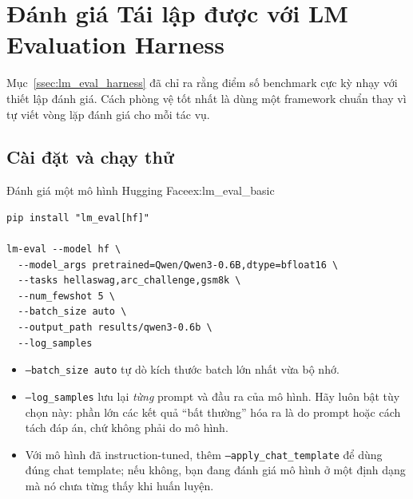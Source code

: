 
\section{Đánh giá Tái lập được với LM Evaluation Harness \newtag}
\label{sec:lm_eval_practice}

Mục~\ref{ssec:lm_eval_harness} đã chỉ ra rằng điểm số benchmark cực kỳ nhạy với thiết lập đánh giá. Cách phòng vệ tốt nhất là dùng một framework chuẩn thay vì tự viết vòng lặp đánh giá cho mỗi tác vụ.

\subsection{Cài đặt và chạy thử}
\label{ssec:lm_eval_setup}
\begin{example}{Đánh giá một mô hình Hugging Face}{ex:lm_eval_basic}
\begin{verbatim}
pip install "lm_eval[hf]"

lm-eval --model hf \
  --model_args pretrained=Qwen/Qwen3-0.6B,dtype=bfloat16 \
  --tasks hellaswag,arc_challenge,gsm8k \
  --num_fewshot 5 \
  --batch_size auto \
  --output_path results/qwen3-0.6b \
  --log_samples
\end{verbatim}
\end{example}
\begin{itemize}
	\item \texttt{--batch\_size auto} tự dò kích thước batch lớn nhất vừa bộ nhớ.
	\item \texttt{--log\_samples} lưu lại \emph{từng} prompt và đầu ra của mô hình. Hãy luôn bật tùy chọn này: phần lớn các kết quả “bất thường” hóa ra là do prompt hoặc cách tách đáp án, chứ không phải do mô hình.
	\item Với mô hình đã instruction-tuned, thêm \texttt{--apply\_chat\_template} để dùng đúng chat template; nếu không, bạn đang đánh giá mô hình ở một định dạng mà nó chưa từng thấy khi huấn luyện.
\end{itemize}

